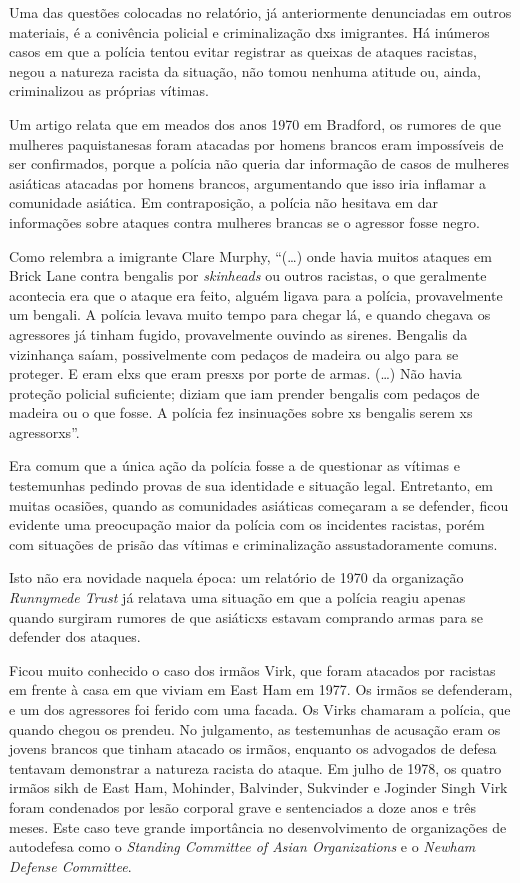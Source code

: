 Uma das questões colocadas no relatório, já anteriormente denunciadas em outros materiais, é a conivência policial e criminalização dxs imigrantes. Há inúmeros casos em que a polícia tentou evitar registrar as queixas de ataques racistas, negou a natureza racista da situação, não tomou nenhuma atitude ou, ainda, criminalizou as próprias vítimas.

Um artigo relata que em meados dos anos 1970 em Bradford, os rumores de que mulheres paquistanesas foram atacadas por homens brancos eram impossíveis de ser confirmados, porque a polícia não queria dar informação de casos de mulheres asiáticas atacadas por homens brancos, argumentando que isso iria inflamar a comunidade asiática. Em contraposição, a polícia não hesitava em dar informações sobre ataques contra mulheres brancas se o agressor fosse negro.


Como relembra a imigrante Clare Murphy, ``(\ldots{}) onde havia muitos ataques em Brick Lane contra bengalis por \emph{skinheads} ou outros racistas, o que geralmente acontecia era que o ataque era feito, alguém ligava para a polícia, provavelmente um bengali. A polícia levava muito tempo para chegar lá, e quando chegava os agressores já tinham fugido, provavelmente ouvindo as sirenes. Bengalis da vizinhança saíam, possivelmente com pedaços de madeira ou algo para se proteger. E eram elxs que eram presxs por porte de armas. (\ldots{}) Não havia proteção policial suficiente; diziam que iam prender bengalis com pedaços de madeira ou o que fosse. A polícia fez insinuações sobre xs bengalis serem xs agressorxs''.

Era comum que a única ação da polícia fosse a de questionar as vítimas e testemunhas pedindo provas de sua identidade e situação legal. Entretanto, em muitas ocasiões, quando as comunidades asiáticas começaram a se defender, ficou evidente uma preocupação maior da polícia com os incidentes racistas, porém com situações de prisão das vítimas e criminalização assustadoramente comuns.

 

Isto não era novidade naquela época: um relatório de 1970 da organização \emph{Runnymede Trust} já relatava uma situação em que a polícia reagiu apenas quando surgiram rumores de que asiáticxs estavam comprando armas para se defender dos ataques.

Ficou muito conhecido o caso dos irmãos Virk, que foram atacados por racistas em frente à casa em que viviam em East Ham em 1977. Os irmãos se defenderam, e um dos agressores foi ferido com uma facada. Os Virks chamaram a polícia, que quando chegou os prendeu. No julgamento, as testemunhas de acusação eram os jovens brancos que tinham atacado os irmãos, enquanto os advogados de defesa tentavam demonstrar a natureza racista do ataque. Em julho de 1978, os quatro irmãos sikh de East Ham, Mohinder, Balvinder, Sukvinder e Joginder Singh Virk foram condenados por lesão corporal grave e sentenciados a doze anos e três meses. Este caso teve grande importância no desenvolvimento de organizações de autodefesa como o \emph{Standing Committee of Asian Organizations} e o \emph{Newham Defense Committee}.


